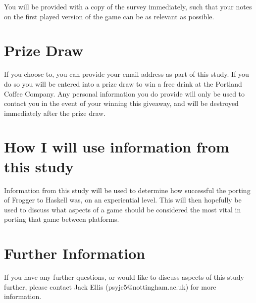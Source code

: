 \documentclass[12pt, a4paper]{report}
\begin{document}
\par

You will be provided with a copy of the survey immediately, such that your notes on the first played version of the game can be as relevant as possible.

\section{Prize Draw}
If you choose to, you can provide your email address as part of this study.
If you do so you will be entered into a prize draw to win a free drink at the Portland Coffee Company.
Any personal information you do provide will only be used to contact you in the event of your winning this giveaway, and will be destroyed immediately after the prize draw.

\section{How I will use information from this study}
Information from this study will be used to determine how successful the porting of Frogger to Haskell was, on an experiential level.
This will then hopefully be used to discuss what aspects of a game should be considered the most vital in porting that game between platforms.

\section{Further Information}
If you have any further questions, or would like to discuss aspects of this study further, please contact Jack Ellis (psyje5@nottingham.ac.uk) for more information.
\end{document}
